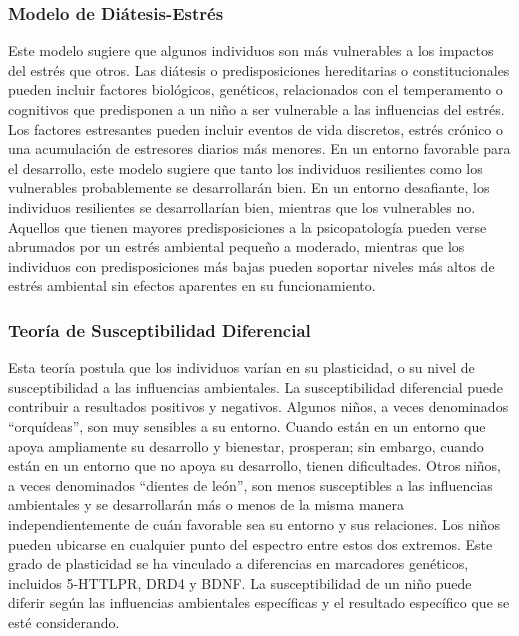 \documentclass[11pt,letterpaper]{report}
\begin{document}
\subsubsection{Modelo de Diátesis-Estrés}
Este modelo sugiere que algunos individuos son más vulnerables a los impactos
del estrés que otros. Las diátesis o predisposiciones hereditarias o
constitucionales pueden incluir factores biológicos, genéticos, relacionados
con el temperamento o cognitivos que predisponen a un niño a ser vulnerable a
las influencias del estrés. Los factores estresantes pueden incluir eventos de
vida discretos, estrés crónico o una acumulación de estresores diarios más
menores. En un entorno favorable para el desarrollo, este modelo sugiere que
tanto los individuos resilientes como los vulnerables probablemente se
desarrollarán bien. En un entorno desafiante, los individuos resilientes se
desarrollarían bien, mientras que los vulnerables no. Aquellos que tienen
mayores predisposiciones a la psicopatología pueden verse abrumados por un
estrés ambiental pequeño a moderado, mientras que los individuos con 
predisposiciones más bajas pueden soportar niveles más altos de estrés
ambiental sin efectos aparentes en su funcionamiento. \cite{Feldman3}

\subsubsection{Teoría de Susceptibilidad Diferencial}
Esta teoría postula que los individuos varían en su plasticidad, o su nivel de
susceptibilidad a las influencias ambientales. \cite{Belsky2021} La
susceptibilidad diferencial puede contribuir a resultados positivos y
negativos. Algunos niños, a veces denominados ``orquídeas'', son muy sensibles
a su entorno. Cuando están en un entorno que apoya ampliamente su desarrollo y
bienestar, prosperan; sin embargo, cuando están en un entorno que no apoya su
desarrollo, tienen dificultades. Otros niños, a veces denominados ``dientes de
león'', son menos susceptibles a las influencias ambientales y se
desarrollarán más o menos de la misma manera independientemente de cuán
favorable sea su entorno y sus relaciones. Los niños pueden ubicarse en
cualquier punto del espectro entre estos dos extremos. Este grado de
plasticidad se ha vinculado a diferencias en marcadores genéticos, incluidos
5-HTTLPR, DRD4 y BDNF. \cite{Belsky2021} La susceptibilidad de un niño puede
diferir según las influencias ambientales específicas y el resultado específico
que se esté considerando. \cite{Feldman3}
\end{document}
